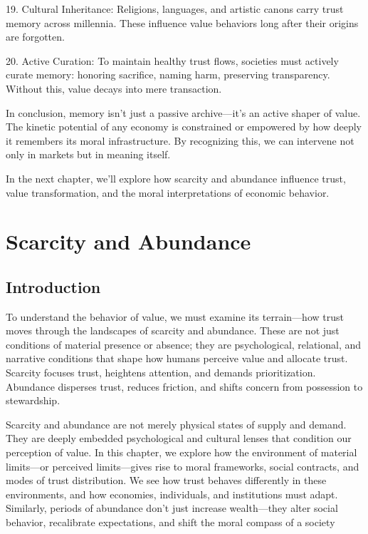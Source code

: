 \documentclass[11pt,oneside]{book}
\begin{document}
19. Cultural Inheritance: Religions, languages, and artistic canons carry trust memory across millennia. These influence value behaviors long after their origins are forgotten.

20. Active Curation: To maintain healthy trust flows, societies must actively curate memory: honoring sacrifice, naming harm, preserving transparency. Without this, value decays into mere transaction.

In conclusion, memory isn’t just a passive archive—it’s an active shaper of value. The kinetic potential of any economy is constrained or empowered by how deeply it remembers its moral infrastructure. By recognizing this, we can intervene not only in markets but in meaning itself.

In the next chapter, we’ll explore how scarcity and abundance influence trust, value transformation, and the moral interpretations of economic behavior.


\chapter{ Scarcity and Abundance}

\section{Introduction}

To understand the behavior of value, we must examine its terrain—how trust moves through the landscapes of scarcity and abundance. These are not just conditions of material presence or absence; they are psychological, relational, and narrative conditions that shape how humans perceive value and allocate trust. Scarcity focuses trust, heightens attention, and demands prioritization. Abundance disperses trust, reduces friction, and shifts concern from possession to stewardship.

Scarcity and abundance are not merely physical states of supply and demand. They are deeply embedded psychological and cultural lenses that condition our perception of value. In this chapter, we explore how the environment of material limits—or perceived limits—gives rise to moral frameworks, social contracts, and modes of trust distribution. We see how trust behaves differently in these environments, and how economies, individuals, and institutions must adapt. Similarly, periods of abundance don't just increase wealth—they alter social behavior, recalibrate expectations, and shift the moral compass of a society
\end{document}
